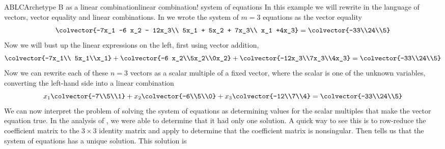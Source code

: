 \begin{example}{ABLC}{Archetype B as a linear combination}{linear combination! system of equations}
In this example we will rewrite  in the language of vectors, vector equality and linear combinations.  In  we wrote the  system of $m=3$ equations as the vector equality
%
\begin{equation*}
\colvector{-7x_1 -6 x_2 - 12x_3\\ 5x_1  + 5x_2 + 7x_3\\ x_1 +4x_3}
=
\colvector{-33\\24\\5}
\end{equation*}
%
Now we will bust up the linear expressions on the left, first using vector addition,
%
\begin{equation*}
\colvector{-7x_1\\ 5x_1\\x_1}+
\colvector{-6 x_2\\5x_2\\0x_2}+
\colvector{-12x_3\\7x_3\\4x_3}
=
\colvector{-33\\24\\5}
\end{equation*}
%
Now we can rewrite each of these $n=3$ vectors as a scalar multiple of a fixed vector, where the scalar is one of the unknown variables, converting the left-hand side into a linear combination
%
\begin{equation*}
x_1\colvector{-7\\5\\1}+
x_2\colvector{-6\\5\\0}+
x_3\colvector{-12\\7\\4}
=
\colvector{-33\\24\\5}
\end{equation*}
%
We can now interpret the problem of solving the system of equations as determining values for the scalar multiples that make the vector equation true.  In the analysis of , we were able to determine that it had only one solution.  A quick way to see this is to row-reduce the coefficient matrix to the $3\times 3$ identity matrix and apply  to determine that the coefficient matrix is nonsingular.  Then  tells us that the system of equations has a unique solution.  This solution is 

\end{example}
